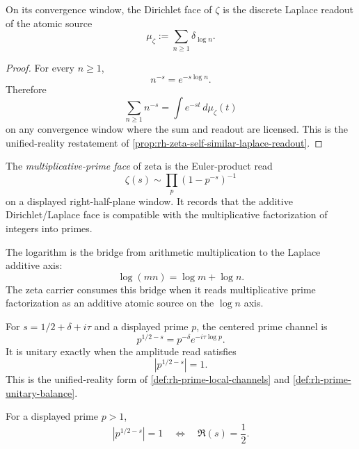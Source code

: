 \begin{theorem}
\label{thm:unified-reality-zeta-arithmetic-laplace-readout}
On its convergence window, the Dirichlet face of $\zeta$ is the discrete
Laplace readout of the atomic source
$$
\mu_{\zeta}:=\sum_{n\ge1}\delta_{\log n}.
$$
\end{theorem}

\begin{proof}
For every $n\ge1$,
$$
n^{-s}=e^{-s\log n}.
$$
Therefore
$$
\sum_{n\ge1}n^{-s}
=
\int e^{-st}\,d\mu_{\zeta}(t)
$$
on any convergence window where the sum and readout are licensed. This
is the unified-reality restatement of
\autoref{prop:rh-zeta-self-similar-laplace-readout}.
\end{proof}

\begin{definition}
\label{def:unified-reality-zeta-multiplicative-prime-face}
The \emph{multiplicative-prime face} of zeta is the Euler-product read
$$
\zeta(s)\sim\prod_p(1-p^{-s})^{-1}
$$
on a displayed right-half-plane window. It records that the additive
Dirichlet/Laplace face is compatible with the multiplicative
factorization of integers into primes.
\end{definition}

\begin{principle}
\label{prin:unified-reality-logarithm-transport-multiplication-laplace}
The logarithm is the bridge from arithmetic multiplication to the
Laplace additive axis:
$$
\log(mn)=\log m+\log n.
$$
The zeta carrier consumes this bridge when it reads multiplicative prime
factorization as an additive atomic source on the $\log n$ axis.
\end{principle}

\begin{definition}
\label{def:unified-reality-prime-channel-unitary-balance}
For $s=1/2+\delta+i\tau$ and a displayed prime $p$, the centered prime
channel is
$$
p^{1/2-s}=p^{-\delta}e^{-i\tau\log p}.
$$
It is unitary exactly when the amplitude read satisfies
$$
|p^{1/2-s}|=1.
$$
This is the unified-reality form of
\autoref{def:rh-prime-local-channels} and
\autoref{def:rh-prime-unitary-balance}.
\end{definition}

\begin{theorem}
\label{thm:unified-reality-critical-line-prime-unitary-surface}
For a displayed prime $p>1$,
$$
|p^{1/2-s}|=1
\quad\Longleftrightarrow\quad
\Re(s)=\frac12.
$$
\end{theorem}

